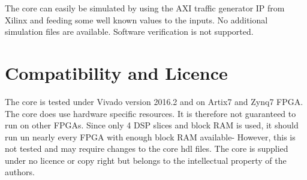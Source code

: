 The core can easily be simulated by using the AXI traffic generator IP from Xilinx and feeding some well known values to the inputs.
No additional simulation files are available.
Software verification is not supported.

\section{Compatibility and Licence}
The core is tested under Vivado version 2016.2 and on Artix7 and Zynq7 FPGA.
The core does use hardware specific resources.
It is therefore not guaranteed to run on other FPGAs.
Since only 4 DSP slices and block RAM is used, it should run un nearly every FPGA with enough block RAM available-
However, this is not tested and may require changes to the core hdl files.
The core is supplied under no licence or copy right but belongs to the intellectual property of the authors.

